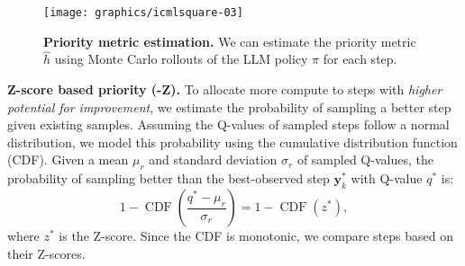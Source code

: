 



\begin{figure}
    \centering
\vspace{-0.3cm}    \texttt{[image: graphics/icmlsquare-03]}
   \vspace{-0.3cm}  
    \caption{\textbf{Priority metric estimation.} We can estimate the priority metric $\hat{h}$ using Monte Carlo rollouts of the LLM policy $\pi$ for each step.}
    \label{fig:metric_estimation}
\vspace{-0.3cm}  
\end{figure}

\textbf{Z-score based priority (\decomp-Z).}  
To allocate more compute to steps with \emph{higher potential for improvement}, we estimate the probability of sampling a better step given existing samples. Assuming the Q-values of sampled steps follow a normal distribution, we model this probability using the cumulative distribution function (CDF). Given a mean $\mu_r$ and standard deviation $\sigma_r$ of sampled Q-values, the probability of sampling better than the best-observed step $\boldsymbol{y}^*_k$ with Q-value $q^*$ is:
\[
1 - \operatorname{CDF}\left(\frac{q^* - \mu_r}{\sigma_r}\right) = 1 - \operatorname{CDF}(z^*),
\]
where $z^*$ is the Z-score. Since the CDF is monotonic, we compare steps based on their Z-scores.

